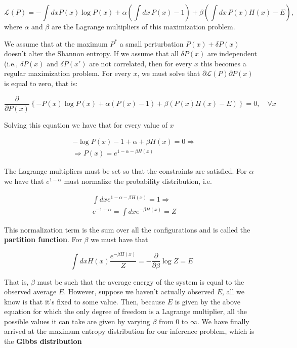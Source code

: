 \begin{equation}
\mathcal{L}(P) =  - \int dx P(x) \log P(x) + \alpha \left(\int dx \, P(x) - 1\right) + \beta \left( \int dx \, P(x) H(x) - E \right),
\end{equation}
where $\alpha$ and $\beta$ are the Lagrange multipliers of this maximization problem. 

We assume that at the maximum $P^\ast$ a small perturbation $P(x) + \delta P(x)$ doesn't alter the Shannon entropy. If we assume that all $\delta P(x)$ are independent (i.e., $\delta P(x)$ and $\delta P(x')$ are not correlated, then for every $x$ this becomes a regular maximization problem. For every $x$, we must solve that $\partial \mathcal{L}(P) \partial P(x)$ is equal to zero, that is:

\begin{equation}
\frac{\partial}{\partial P(x)}\left\{ -P(x) \log P(x) + \alpha \left(P(x) - 1\right) + \beta \left(P(x) H(x) - E\right) \right\} = 0, \quad \forall x  
\end{equation}

Solving this equation we have that for every value of $x$

\begin{align}
    & -\log P(x) - 1 + \alpha + \beta H(x) = 0 \Rightarrow \\
    & \Rightarrow  P(x) = e^{1 - \alpha - \beta H(x)}
\end{align}

The Lagrange multipliers must be set so that the constraints are satisfied. For $\alpha$ we have that $e^{1 - \alpha}$ must normalize the probability distribution, i.e.

\begin{align}
   &  \int dx e^{1 - \alpha - \beta H(x)} = 1 \Rightarrow \\
    & e^{-1 + \alpha} = \int dx e^{- \beta H(x)} = Z
\end{align}

This normalization term is the sum over all the configurations and is called the \textbf{partition function}. For $\beta$ we must have that 

\begin{equation}
    \int dx H(x) \frac{e^{-\beta H(x)}}{Z} = - \frac{\partial}{\partial \beta} \log Z = E
\end{equation}

That is, $\beta$ must be such that the average energy of the system is equal to the observed average $E$. However, suppose we haven't actually observed $E$, all we know is that it's fixed to some  value. Then, because $E$ is given by the above equation for which the only degree of freedom is a Lagrange multiplier, all the possible values it can take are given by varying $\beta$ from 0 to $\infty$. We have finally arrived at the maximum entropy distribution for our inference problem, which is the \textbf{Gibbs distribution}

